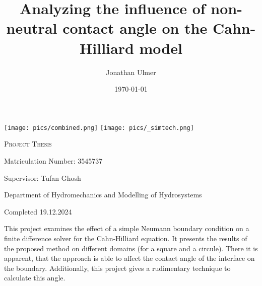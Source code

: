 \documentclass{mimosis}
\author{Jonathan Ulmer}
\date{\today}
\title{Analyzing the influence of non-neutral contact angle on the Cahn-Hilliard model}
\newenvironment{abstract} {}{}
\begin{document}
\frontmatter
\makeatletter
\begin{titlepage}
    \centering
\texttt{[image: pics/combined.png]}
\texttt{[image: pics/\_simtech.png]}
\par
	\vspace{1.5cm}
	{\scshape\huge Project Thesis \par}
	\vspace{1.5cm}
	{\Huge\bfseries  \@title \par}
	\vspace{2cm}
	{\LARGE \@author \par}
	{\Large Matriculation Number: 3545737 \par}
	\vspace{1.5cm}
	{\large Supervisor: Tufan Ghosh\par}
	\vspace{1.5cm}
	{\large Department of Hydromechanics and Modelling of Hydrosystems \par}



	\vfill

	{\large Completed 19.12.2024 \par}
\end{titlepage}
\makeatother

\begin{abstract}
This project examines the effect of a simple Neumann boundary condition on a finite difference solver for the Cahn-Hilliard equation. It presents the results of the proposed method on different domains (for a square and a circule). There it is apparent, that the approach is able to affect the contact angle of the interface on the boundary. Additionally, this project gives a rudimentary technique to calculate this angle.
\end{abstract}

\setcounter{tocdepth}{3}
\tableofcontents
\listoffigures
\mainmatter
\end{document}
